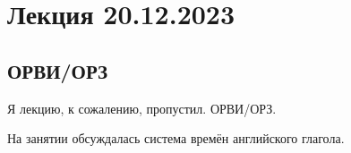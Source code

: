 \documentclass[main.tex]{subfiles}
\begin{document}
\section{Лекция 20.12.2023}

\subsection{ОРВИ/ОРЗ}

Я лекцию, к сожалению, пропустил. ОРВИ/ОРЗ.

На занятии обсуждалась система времён английского глагола.
\end{document}
